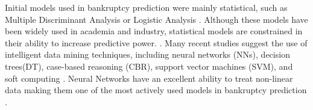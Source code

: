 

Initial models used in bankruptcy prediction were mainly statistical, such as Multiple Discriminant Analysis \cite{Altman} or Logistic Analysis \cite{ohlson1980financial}. Although these models have been widely used in academia and industry, statistical models are constrained in their ability to increase predictive power. \cite{begley1996bankruptcy}. 
Many recent studies suggest the use of intelligent data mining techniques, including neural networks (NNs), decision trees(DT), case-based reasoning (CBR), support vector machines (SVM), and soft computing \cite{kumar2007bankruptcy}. Neural Networks have an excellent ability to treat non-linear data making them one of the most actively used models in bankruptcy prediction \cite{chandra2010support,baek2003bankruptcy,charalambous2000application}. 

